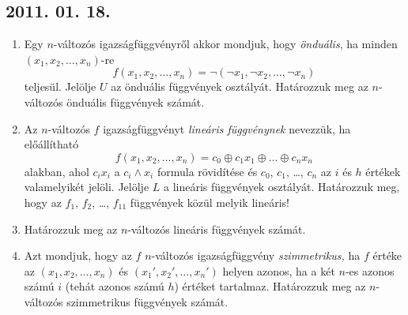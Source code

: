 \subsection*{2011. 01. 18.}
\begin{enumerate}
\item Egy $n$-változós igazságfüggvényről akkor mondjuk, hogy \emph{önduális}, ha minden $\left(x_1, x_2, \ldots, x_n\right)$-re
\[f\left(x_1, x_2, \ldots, x_n\right)=\neg \left(\neg x_1, \neg x_2, \ldots, \neg x_n\right)\]
teljesül. Jelölje $U$ az önduális függvények osztályát. Határozzuk meg az $n$-változós önduális függvények számát.
\item Az $n$-változós $f$ igazságfüggvényt \emph{lineáris függvénynek} nevezzük, ha előállítható
\[f\left(x_1, x_2, \ldots, x_n\right)=c_0\oplus c_1x_1\oplus\ldots\oplus c_n x_n\]
alakban, ahol $c_i x_i$ a $c_i\land x_i$ formula rövidítése és $c_0$, $c_1$, \ldots, $c_n$ az $i$ és $h$ értékek valamelyikét jelöli. Jelölje $L$ a lineáris függvények osztályát. Határozzuk meg, hogy az $f_1$, $f_2$, \ldots, $f_{11}$ függvények közül melyik lineáris!
\item Határozzuk meg az $n$-változós lineáris függvények számát.
\item Azt mondjuk, hogy az $f$ $n$-változós igazságfüggvény \emph{szimmetrikus,} ha $f$ értéke az $\left(x_1, x_2, \ldots, x_n\right)$ és $\left(x_1', x_2', \ldots, x_n'\right)$ helyen azonos, ha a két $n$-es azonos számú $i$ (tehát azonos számú $h$) értéket tartalmaz. Határozzuk meg az $n$-változós szimmetrikus függvények számát.
\end{enumerate}

